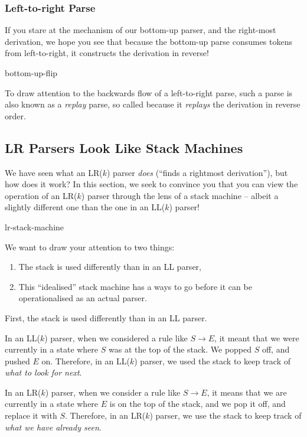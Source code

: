 \subsubsection{Left-to-right Parse}
If you stare at the mechanism of our bottom-up parser, and the right-most derivation, we hope you see that because the bottom-up parse consumes tokens from left-to-right, it  constructs the derivation in reverse! 

\begin{center}
    {bottom-up-flip}
\end{center}

To draw attention to the backwards flow of a left-to-right parse, such a parse is also known as a \textit{replay} parse, so called because it \textit{replays} the derivation in reverse order.

\subsection{LR Parsers Look Like Stack Machines}\label{section:lr-stack-machine}
We have seen what an LR($k$) parser \textit{does} (``finds a rightmost derivation''), but how does it work? In this section, we seek to convince you that you can view the operation of an LR($k$) parser through the lens of a stack machine -- albeit a slightly different one than the one in an LL($k$) parser!

\begin{center}
    {lr-stack-machine}
\end{center}

We want to draw your attention to two things:
\begin{enumerate}
    \item The stack is used differently than in an LL parser,
    \item This ``idealised'' stack machine has a ways to go before it can be operationalised as an actual parser.
\end{enumerate}

First, the stack is used differently than in an LL parser.

In an LL($k$) parser, when we considered a rule like $S \rightarrow E$, it meant that we were currently in a state where $S$ was at the top of the stack. We popped $S$ off, and pushed $E$ on. Therefore, in an LL($k$) parser, we used the stack to keep track of \textit{what to look for next}. 

In an LR($k$) parser, when we consider a rule like $S \rightarrow E$, it means that we are currently in a state where $E$ is on the top of the stack, and we pop it off, and replace it with $S$. Therefore, in an LR($k$) parser, we use the stack to keep track of \textit{what we have already seen}.

